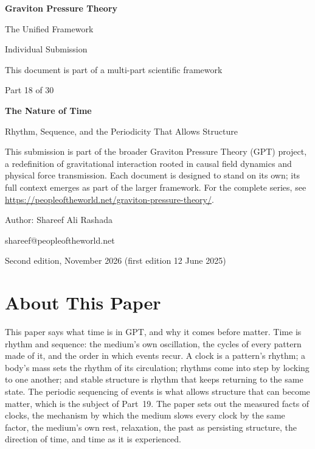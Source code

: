 \documentclass[11pt,a4paper]{article}
\begin{document}
\renewcommand{\thetable}{18.\arabic{table}}
\begin{titlepage}
\centering
\vspace*{1.5cm}
{\Huge\bfseries Graviton Pressure Theory\par}
\vspace{0.4cm}
{\Large The Unified Framework\par}
{\large Individual Submission\par}
\vspace{0.3cm}
{\normalsize This document is part of a multi-part scientific framework\par}
\vspace{1.6cm}
{\large Part 18 of 30\par}
\vspace{0.6cm}
{\huge\bfseries The Nature of Time\par}
\vspace{0.5cm}
{\Large Rhythm, Sequence, and the Periodicity That Allows Structure\par}
\vspace{1.4cm}
\begin{minipage}{0.82\textwidth}\centering\small
This submission is part of the broader Graviton Pressure Theory (GPT) project, a redefinition of gravitational interaction rooted in causal field dynamics and physical force transmission. Each document is designed to stand on its own; its full context emerges as part of the larger framework. For the complete series, see \url{https://peopleoftheworld.net/graviton-pressure-theory/}.
\end{minipage}
\vfill
{\large Author: Shareef Ali Rashada\par}
{\normalsize shareef@peopleoftheworld.net\par}
\vspace{0.3cm}
{\normalsize Second edition, November 2026 \quad (first edition 12 June 2025)\par}
\end{titlepage}

\tableofcontents
\newpage

\section*{About This Paper}

This paper says what time is in GPT, and why it comes before matter. Time is rhythm and sequence: the medium's own oscillation, the cycles of every pattern made of it, and the order in which events recur. A clock is a pattern's rhythm; a body's mass sets the rhythm of its circulation; rhythms come into step by locking to one another; and stable structure is rhythm that keeps returning to the same state. The periodic sequencing of events is what allows structure that can become matter, which is the subject of Part~19. The paper sets out the measured facts of clocks, the mechanism by which the medium slows every clock by the same factor, the medium's own rest, relaxation, the past as persisting structure, the direction of time, and time as it is experienced.
\end{document}

